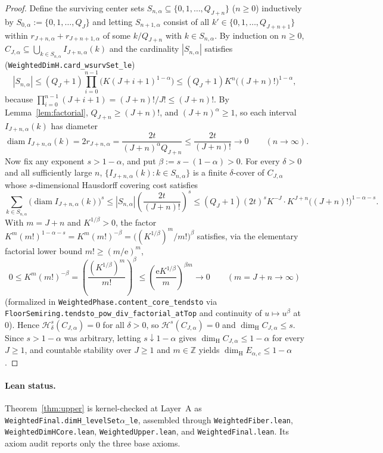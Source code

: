 \documentclass[11pt]{article}
\theoremstyle{definition}
\theoremstyle{remark}
\newcommand{\Z}{\mathbb{Z}}
\newcommand{\ee}{\mathrm{e}}
\newcommand{\dimH}{\dim_{\mathrm{H}}}
\begin{document}
\begin{proof}
Define the surviving center sets $S_{n,\alpha}\subseteq\{0,1,\dots,Q_{J+n}\}$
($n\ge0$) inductively by $S_{0,\alpha}:=\{0,1,\dots,Q_J\}$ and letting
$S_{n+1,\alpha}$ consist of all $k'\in\{0,1,\dots,Q_{J+n+1}\}$ within
$r_{J+n,\alpha}+r_{J+n+1,\alpha}$ of some $k/Q_{J+n}$ with $k\in S_{n,\alpha}$.
By induction on $n\ge0$, $C_{J,\alpha}\subseteq\bigcup_{k\in S_{n,\alpha}}I_{J+n,\alpha}(k)$
and the cardinality $|S_{n,\alpha}|$ satisfies
(\texttt{WeightedDimH.card\_wsurvSet\_le})
\[
|S_{n,\alpha}|
\le(Q_J+1)\prod_{i=0}^{n-1}\bigl(K(J+i+1)^{1-\alpha}\bigr)
\le(Q_J+1)K^n\bigl((J+n)!\bigr)^{1-\alpha},
\]
because $\prod_{i=0}^{n-1}(J+i+1)=(J+n)!/J!\le(J+n)!$. By
Lemma~\ref{lem:factorial}, $Q_{J+n}\ge(J+n)!$, and $(J+n)^\alpha\ge1$, so each
interval $I_{J+n,\alpha}(k)$ has diameter
\[
\operatorname{diam}I_{J+n,\alpha}(k)=2r_{J+n,\alpha}
=\frac{2t}{(J+n)^\alpha Q_{J+n}}\le\frac{2t}{(J+n)!}\longrightarrow0
\qquad(n\to\infty).
\]
Now fix any exponent $s>1-\alpha$, and put $\beta:=s-(1-\alpha)>0$. For every
$\delta>0$ and all sufficiently large $n$, $\{I_{J+n,\alpha}(k):k\in S_{n,\alpha}\}$
is a finite $\delta$-cover of $C_{J,\alpha}$ whose $s$-dimensional Hausdorff
covering cost satisfies
\[
\sum_{k\in S_{n,\alpha}}\bigl(\operatorname{diam}I_{J+n,\alpha}(k)\bigr)^s
\le |S_{n,\alpha}|\left(\frac{2t}{(J+n)!}\right)^s
\le(Q_J+1)(2t)^s K^{-J}\cdot K^{J+n}\bigl((J+n)!\bigr)^{1-\alpha-s}.
\]
With $m=J+n$ and $K^{1/\beta}>0$, the factor $K^m(m!)^{1-\alpha-s}=K^m(m!)^{-\beta}=\bigl((K^{1/\beta})^m/m!\bigr)^\beta$
satisfies, via the elementary factorial lower bound $m!\ge(m/\ee)^m$,
\[
0\le K^m(m!)^{-\beta}=\left(\frac{(K^{1/\beta})^m}{m!}\right)^\beta
\le\left(\frac{\ee K^{1/\beta}}{m}\right)^{\beta m}\longrightarrow0
\qquad(m=J+n\to\infty)
\]
(formalized in \texttt{WeightedPhase.\allowbreak content\_\allowbreak core\_\allowbreak tendsto} via
\texttt{FloorSemiring.\allowbreak tendsto\_\allowbreak pow\_\allowbreak div\_\allowbreak factorial\_\allowbreak atTop} and continuity of
$u\mapsto u^\beta$ at $0$). Hence $\mathcal H_\delta^s(C_{J,\alpha})=0$ for all
$\delta>0$, so $\mathcal H^s(C_{J,\alpha})=0$ and $\dimH C_{J,\alpha}\le s$.
Since $s>1-\alpha$ was arbitrary, letting $s\downarrow1-\alpha$ gives
$\dimH C_{J,\alpha}\le1-\alpha$ for every $J\ge1$, and countable stability over
$J\ge1$ and $m\in\Z$ yields $\dimH E_{\alpha,c}\le1-\alpha$.
\end{proof}

\paragraph{Lean status.} Theorem~\ref{thm:upper} is kernel-checked at Layer~A
as \texttt{WeightedFinal.\allowbreak dimH\_levelSet\ensuremath{\alpha}\_le},
assembled through \texttt{WeightedFiber.lean}, \texttt{WeightedDimHCore.lean},
\texttt{WeightedUpper.lean}, and \texttt{WeightedFinal.lean}. Its axiom audit
reports only the three base axioms.
\end{document}
